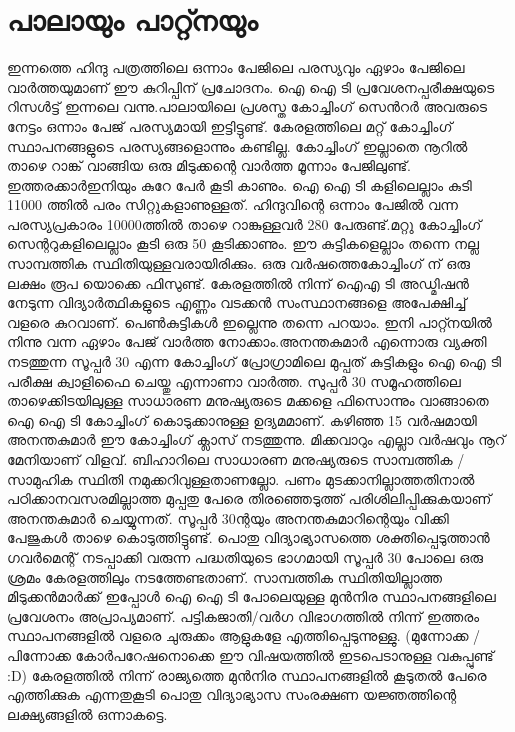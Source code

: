 \documentclass[10pt,a4paper]{report}
\begin{document}
  \section{പാലായും പാറ്റ്നയും}
   ഇന്നത്തെ ഹിന്ദു പത്രത്തിലെ ഒന്നാം പേജിലെ പരസ്യവും ഏഴാം പേജിലെ വാർത്തയുമാണ് ഈ കുറിപ്പിന് പ്രചോദനം. ഐ ഐ ടി പ്രവേശനപ്പരീക്ഷയുടെ റിസൾട്ട് ഇന്നലെ വന്നു.പാലായിലെ പ്രശസ്ത കോച്ചിംഗ് സെൻറർ അവരുടെ നേട്ടം ഒന്നാം പേജ് പരസ്യമായി ഇട്ടിട്ടുണ്ട്. കേരളത്തിലെ മറ്റ് കോച്ചിംഗ് സ്ഥാപനങ്ങളുടെ പരസ്യങ്ങളൊന്നും കണ്ടില്ല. കോച്ചിംഗ് ഇല്ലാതെ നൂറിൽ താഴെ റാങ്ക് വാങ്ങിയ ഒരു മിടുക്കന്റെ വാർത്ത മൂന്നാം പേജിലുണ്ട്. ഇത്തരക്കാർഇനിയും കുറേ പേർ കൂടി കാണും. ഐ ഐ ടി കളിലെല്ലാം കുടി 11000 ത്തിൽ പരം സിറ്റുകളാണുള്ളത്. ഹിന്ദുവിന്റെ ഒന്നാം പേജിൽ വന്ന പരസ്യപ്രകാരം 10000ത്തിൽ താഴെ റാങ്കുള്ളവർ 280 പേരുണ്ട്.മറ്റു കോച്ചിംഗ് സെന്ററുകളിലെല്ലാം കൂടി ഒരു 50 കൂടിക്കാണും. ഈ കുട്ടികളെല്ലാം തന്നെ നല്ല സാമ്പത്തിക സ്ഥിതിയുള്ളവരായിരിക്കും. ഒരു വർഷത്തെകോച്ചിംഗ് ന് ഒരു ലക്ഷം രൂപ യൊക്കെ ഫിസുണ്ട്. കേരളത്തിൽ നിന്ന് ഐഎ ടി അഡ്മിഷൻ നേടുന്ന വിദ്യാർത്ഥികളുടെ എണ്ണം വടക്കൻ സംസ്ഥാനങ്ങളെ അപേക്ഷിച്ച് വളരെ കുറവാണ്. പെൺകുട്ടികൾ ഇല്ലെന്നു തന്നെ പറയാം. ഇനി പാറ്റ്നയിൽ നിന്നു വന്ന ഏഴാം പേജ് വാർത്ത നോക്കാം.അനന്തകുമാർ എന്നൊരു വ്യക്തി നടത്തുന്ന സൂപ്പർ 30 എന്ന കോച്ചിംഗ് പ്രോഗ്രാമിലെ മുപ്പത് കുട്ടികളും ഐ ഐ ടി പരീക്ഷ ക്വാളിഫൈ ചെയ്തു എന്നാണാ വാർത്ത. സുപ്പർ 30 സമൂഹത്തിലെ താഴെക്കിടയിലുള്ള സാധാരണ മനുഷ്യരുടെ മക്കളെ ഫിസൊന്നും വാങ്ങാതെ ഐ ഐ ടി കോച്ചിംഗ് കൊടുക്കാനുള്ള ഉദ്യമമാണ്. കഴിഞ്ഞ 15 വർഷമായി അനന്തകുമാർ ഈ കോച്ചിംഗ് ക്ലാസ് നടത്തുന്നു. മിക്കവാറും എല്ലാ വർഷവും നൂറ് മേനിയാണ് വിളവ്. ബിഹാറിലെ സാധാരണ മനുഷ്യരുടെ സാമ്പത്തിക / സാമുഹിക സ്ഥിതി നമുക്കറിവുള്ളതാണല്ലോ. പണം മുടക്കാനില്ലാത്തതിനാൽ പഠിക്കാനവസരമില്ലാത്ത മുപ്പതു പേരെ തിരഞ്ഞെടുത്ത് പരിശിലിപ്പിക്കുകയാണ് അനന്തകുമാർ ചെയ്യുന്നത്. സൂപ്പർ 30ന്റയും അനന്തകുമാറിന്റെയും വിക്കി പേജുകൾ താഴെ കൊടുത്തിട്ടുണ്ട്. പൊതു വിദ്യാഭ്യാസത്തെ ശക്തിപ്പെടുത്താൻ ഗവർമെന്റ് നടപ്പാക്കി വരുന്ന പദ്ധതിയുടെ ഭാഗമായി സൂപ്പർ 30 പോലെ ഒരു ശ്രമം കേരളത്തിലും നടത്തേണ്ടതാണ്. സാമ്പത്തിക സ്ഥിതിയില്ലാത്ത മിടുക്കൻമാർക്ക് ഇപ്പോൾ ഐ ഐ ടി പോലെയുള്ള മുൻനിര സ്ഥാപനങ്ങളിലെ പ്രവേശനം അപ്രാപ്യമാണ്. പട്ടികജാതി/വർഗ വിഭാഗത്തിൽ നിന്ന് ഇത്തരം സ്ഥാപനങ്ങളിൽ വളരെ ചുരുക്കം ആളുകളേ എത്തിപ്പെടുന്നുള്ളു. (മുന്നോക്ക /പിന്നോക്ക കോർപറേഷനൊക്കെ ഈ വിഷയത്തിൽ ഇടപെടാനുള്ള വകുപ്പുണ്ട് :D) കേരളത്തിൽ നിന്ന് രാജ്യത്തെ മുൻനിര സ്ഥാപനങ്ങളിൽ കൂടുതൽ പേരെ എത്തിക്കുക എന്നതുകൂടി പൊതു വിദ്യാഭ്യാസ സംരക്ഷണ യജ്ഞത്തിന്റെ ലക്ഷ്യങ്ങളിൽ ഒന്നാകട്ടെ.
   
 
\end{document}
